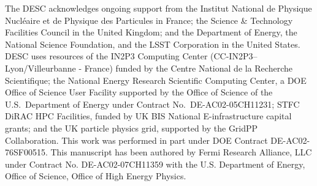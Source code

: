 % 
%
%
%
%
%
% 
%
The DESC acknowledges ongoing support from the Institut National de Physique Nucl\'eaire et de Physique des Particules in France; the Science \& Technology Facilities Council in the United Kingdom; and the Department of Energy, the National Science Foundation, and the LSST Corporation in the United States.  DESC uses resources of the IN2P3 Computing Center (CC-IN2P3--Lyon/Villeurbanne - France) funded by the Centre National de la Recherche Scientifique; the National Energy Research Scientific Computing Center, a DOE Office of Science User Facility supported by the Office of Science of the U.S.\ Department of Energy under Contract No.\ DE-AC02-05CH11231; STFC DiRAC HPC Facilities, funded by UK BIS National E-infrastructure capital grants; and the UK particle physics grid, supported by the GridPP Collaboration.  This work was performed in part under DOE Contract DE-AC02-76SF00515.
This manuscript has been authored by Fermi Research Alliance, LLC under Contract No. DE-AC02-07CH11359 with the U.S. Department of Energy, Office of Science, Office of High Energy Physics.

% 
% 
